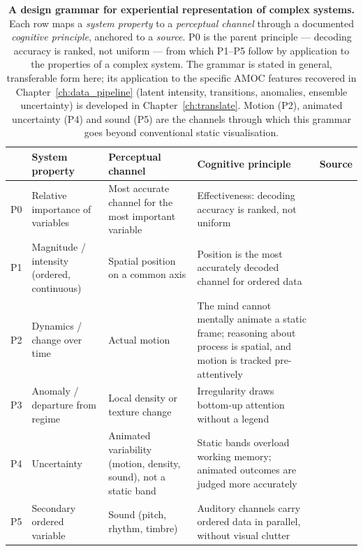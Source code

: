 \begin{table}[!ht]
    \centering
    \small
    \caption[A design grammar for experiential representation of complex systems.]{\textbf{A design grammar for experiential representation of complex systems.}
             Each row maps a \emph{system property} to a \emph{perceptual channel} through a
             documented \emph{cognitive principle}, anchored to a \emph{source}. P0 is the parent
             principle --- decoding accuracy is ranked, not uniform --- from which P1--P5 follow
             by application to the properties of a complex system. The grammar is stated in
             general, transferable form here; its application to the specific AMOC features
             recovered in Chapter~\ref{ch:data_pipeline} (latent intensity, transitions, anomalies,
             ensemble uncertainty) is developed in Chapter~\ref{ch:translate}. Motion (P2),
             animated uncertainty (P4) and sound (P5) are the channels through which this
             grammar goes beyond conventional static visualisation.}
    \label{tab:design-grammar}
    \begin{tabular}{@{}p{0.5cm}p{2.5cm}p{2.9cm}p{3.3cm}p{2.3cm}@{}}
        \toprule
        & \textbf{System property} & \textbf{Perceptual channel} & \textbf{Cognitive principle} & \textbf{Source} \\
        \midrule
        P0 & Relative importance of variables
           & Most accurate channel for the most important variable
           & Effectiveness: decoding accuracy is ranked, not uniform
           & \citet{bertin1983, clevelandmcgill1984, munzner2014} \\[0.4em]
        P1 & Magnitude / intensity (ordered, continuous)
           & Spatial position on a common axis
           & Position is the most accurately decoded channel for ordered data
           & \citet{clevelandmcgill1984, munzner2014} \\[0.4em]
        P2 & Dynamics / change over time
           & Actual motion
           & The mind cannot mentally animate a static frame; reasoning about process is spatial, and motion is tracked pre-attentively
           & \citet{sterman2008, cronin2009, tversky2019, ware2021} \\[0.4em]
        P3 & Anomaly / departure from regime
           & Local density or texture change
           & Irregularity draws bottom-up attention without a legend
           & \citet{bertin1983, ware2021} \\[0.4em]
        P4 & Uncertainty
           & Animated variability (motion, density, sound), not a static band
           & Static bands overload working memory; animated outcomes are judged more accurately
           & \citet{padilla2018, hullman2015hops, kale2019hops} \\[0.4em]
        P5 & Secondary ordered variable
           & Sound (pitch, rhythm, timbre)
           & Auditory channels carry ordered data in parallel, without visual clutter
           & \citet{hermann2011} \\
        \bottomrule
    \end{tabular}
\end{table}

